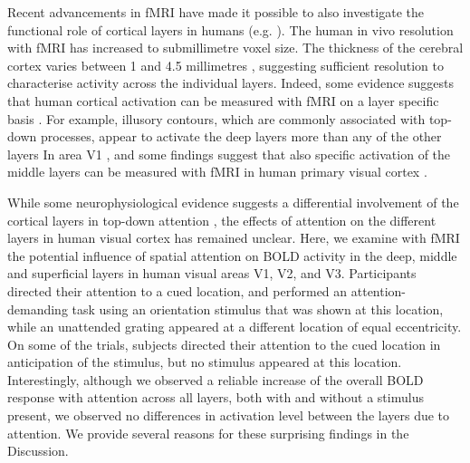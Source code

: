 Recent advancements in fMRI have made it possible to also investigate the functional role of cortical layers in humans (e.g. \cite{Polimeni2010,Maass2014,Kok2016}). The human in vivo resolution with fMRI has increased to submillimetre voxel size. The thickness of the cerebral cortex varies between 1 and 4.5 millimetres \cite{Zilles1990,Fischl2000}, suggesting sufficient resolution to characterise activity across the individual layers. Indeed, some evidence suggests that human cortical activation can be measured with fMRI on a layer specific basis \cite{ Kok2016, Muckli2015}. For example, illusory contours, which are commonly associated with top-down processes, appear to activate the deep layers more than any of the other layers In area V1 \cite{Kok2016}, and some findings suggest that also specific activation of the middle layers can be measured with fMRI in human primary visual cortex \cite{Koopmans2010}.

While some neurophysiological evidence suggests a differential involvement of the cortical layers in top-down attention \cite{Nandy2017}, the effects of attention on the different layers in human visual cortex has remained unclear. Here, we examine with fMRI the potential influence of spatial attention on BOLD activity in the deep, middle and superficial layers in human visual areas V1, V2, and V3. Participants directed their attention to a cued location, and performed an attention-demanding task using an orientation stimulus that was shown at this location, while an unattended grating appeared at a different location of equal eccentricity. On some of the trials, subjects directed their attention to the cued location in anticipation of the stimulus, but no stimulus appeared at this location. Interestingly, although we observed a reliable increase of the overall BOLD response with attention across all layers, both with and without a stimulus present, we observed no differences in activation level between the layers due to attention. We provide several reasons for these surprising findings in the Discussion.
